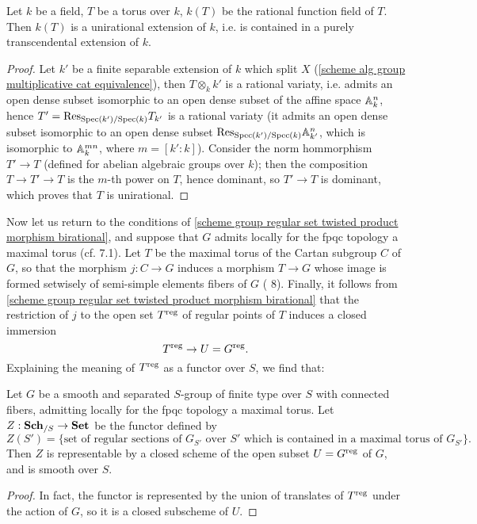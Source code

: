 \begin{lemma}
Let $k$ be a field, $T$ be a torus over $k$, $k(T)$ be the rational function field of $T$. Then $k(T)$ is a unirational extension of $k$, i.e. is contained in a purely transcendental extension of $k$.
\end{lemma}
\begin{proof}
Let $k'$ be a finite separable extension of $k$ which split $X$ (\cref{scheme alg group multiplicative cat equivalence}), then $T\otimes_kk'$ is a rational variaty, i.e. admits an open dense subset isomorphic to an open dense subset of the affine space $\mathbb{A}_k^n$, hence $T'=\mathrm{Res}_{\mathrm{Spec}(k')/\mathrm{Spec}(k)}T_{k'}$ is a rational variaty (it admits an open dense subset isomorphic to an open dense subset $\mathrm{Res}_{\mathrm{Spec}(k')/\mathrm{Spec}(k)}\mathbb{A}_{k'}^n$, which is isomorphic to $\mathbb{A}_{k}^{mn}$, where $m=[k':k]$). Consider the norm hommorphism $T'\to T$ (defined for abelian algebraic groups over $k$); then the composition $T\to T'\to T$ is the $m$-th power on $T$, hence dominant, so $T'\to T$ is dominant, which proves that $T$ is unirational.
\end{proof}

Now let us return to the conditions of \cref{scheme group regular set twisted product morphism birational}, and suppose that $G$ admits locally for the fpqc topology a maximal torus (cf. \cite{SGA3-2}  7.1). Let $T$ be the maximal torus of the Cartan subgroup $C$ of $G$, so that the morphism $j:C\to G$ induces a morphism $T\to G$ whose image is formed setwisely of semi-simple elements fibers of $G$ (\cite{SGA3-2}  8). Finally, it follows from \cref{scheme group regular set twisted product morphism birational} that the restriction of $j$ to the open set $T^{\mathrm{reg}}$ of regular points of $T$ induces a closed immersion
\[T^{\mathrm{reg}}\to U=G^{\mathrm{reg}}.\]
Explaining the meaning of $T^{\mathrm{reg}}$ as a functor over $S$, we find that:

\begin{corollary}\label{scheme group smooth sp functor of regular section in torus representable}
Let $G$ be a smooth and separated $S$-group of finite type over $S$ with connected fibers, admitting locally for the fpqc topology a maximal torus. Let $Z:\mathbf{Sch}_{/S}\to\mathbf{Set}$ be the functor defined by
\[Z(S')=\{\text{set of regular sections of $G_{S'}$ over $S'$ which is contained in a maximal torus of $G_{S'}$}\}.\]
Then $Z$ is representable by a closed scheme of the open subset $U=G^{\mathrm{reg}}$ of $G$, and is smooth over $S$. 
\end{corollary}
\begin{proof}
In fact, the functor is represented by the union of translates of $T^{\mathrm{reg}}$ under the action of $G$, so it is a closed subscheme of $U$.
\end{proof}

